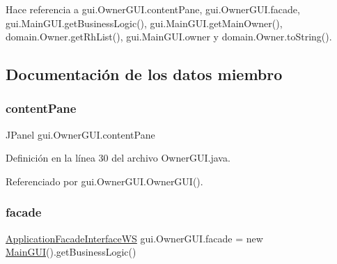 \begin{DoxyCode}{0}

\end{DoxyCode}


Hace referencia a gui.\+Owner\+G\+U\+I.\+content\+Pane, gui.\+Owner\+G\+U\+I.\+facade, gui.\+Main\+G\+U\+I.\+get\+Business\+Logic(), gui.\+Main\+G\+U\+I.\+get\+Main\+Owner(), domain.\+Owner.\+get\+Rh\+List(), gui.\+Main\+G\+U\+I.\+owner y domain.\+Owner.\+to\+String().



\subsection{Documentación de los datos miembro}
\mbox{\label{classgui_1_1_owner_g_u_i_a1e284b6506332a7360b4d3b706de3404}} 
\subsubsection{\texorpdfstring{contentPane}{contentPane}}
{\footnotesize\ttfamily J\+Panel gui.\+Owner\+G\+U\+I.\+content\+Pane\hspace{0.3cm}{\ttfamily [private]}}



Definición en la línea 30 del archivo Owner\+G\+U\+I.\+java.



Referenciado por gui.\+Owner\+G\+U\+I.\+Owner\+G\+U\+I().

\mbox{\label{classgui_1_1_owner_g_u_i_adc21b31ee1addb912b73455e4e78d130}} 
\subsubsection{\texorpdfstring{facade}{facade}}
{\footnotesize\ttfamily \mbox{\hyperlink{interfacebusiness_logic_1_1_application_facade_interface_w_s}{Application\+Facade\+Interface\+WS}} gui.\+Owner\+G\+U\+I.\+facade = new \mbox{\hyperlink{classgui_1_1_main_g_u_i}{Main\+G\+UI}}().get\+Business\+Logic()\hspace{0.3cm}{\ttfamily [private]}}



